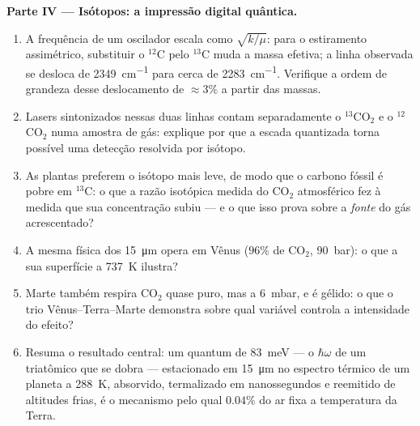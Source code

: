 \begin{problem}
\medskip\noindent\textbf{Parte IV --- Isótopos: a impressão digital
quântica.}
\begin{enumerate}[resume]
  \item A frequência de um oscilador escala como $\sqrt{k/\mu}$: para
        o estiramento assimétrico, substituir o $^{12}$C pelo $^{13}$C
        muda a massa efetiva; a linha observada se desloca de
        \qty{2349}{cm^{-1}} para cerca de \qty{2283}{cm^{-1}}.
        Verifique a ordem de grandeza desse deslocamento de
        $\approx 3\%$ a partir das massas.
  \item Lasers sintonizados nessas duas linhas contam separadamente o
        $^{13}$CO$_2$ e o $^{12}$CO$_2$ numa amostra de gás: explique
        por que a escada quantizada torna possível uma detecção
        resolvida por isótopo.
  \item As plantas preferem o isótopo mais leve, de modo que o carbono
        fóssil é pobre em $^{13}$C: o que a razão isotópica medida do
        CO$_2$ atmosférico fez à medida que sua concentração subiu ---
        e o que isso prova sobre a \emph{fonte} do gás acrescentado?
  \item A mesma física dos \qty{15}{\micro m} opera em Vênus
        ($96\%$ de CO$_2$, \qty{90}{bar}): o que a sua superfície a
        \qty{737}{K} ilustra?
  \item Marte também respira CO$_2$ quase puro, mas a \qty{6}{mbar}, e
        é gélido: o que o trio Vênus--Terra--Marte demonstra sobre qual
        variável controla a intensidade do efeito?
  \item Resuma o resultado central: um quantum de \qty{83}{meV} ---
        o $\hbar\omega$ de um triatômico que se dobra --- estacionado
        em \qty{15}{\micro m} no espectro térmico de um planeta a
        \qty{288}{K}, absorvido, termalizado em nanossegundos e
        reemitido de altitudes frias, é o mecanismo pelo qual $0.04\%$
        do ar fixa a temperatura da Terra.
\end{enumerate}
\end{problem}
